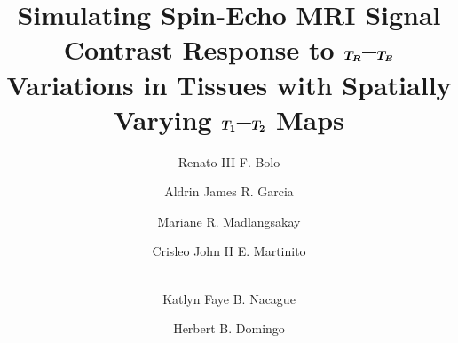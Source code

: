 \documentclass[10pt,a4paper,twoside]{article}
\begin{document}
\title{\TitleFont Simulating Spin-Echo MRI Signal Contrast Response to $\vb*{T_R}$–$\vb*{T_E}$ Variations in Tissues with Spatially Varying $\vb*{T_1}$–$\vb*{T_2}$ Maps}




\author[a,*]{Renato III F. Bolo\authorsep}
\author[a]{Aldrin James R. Garcia\authorsep}
\author[a]{Mariane R. Madlangsakay\authorsep}
\author[a]{Crisleo John II E. Martinito\authorsep}
\author[a]{\\ Katlyn Faye B. Nacague\authorsep}
\author[a]{Herbert B. Domingo\lastauthorsep}
\end{document}
